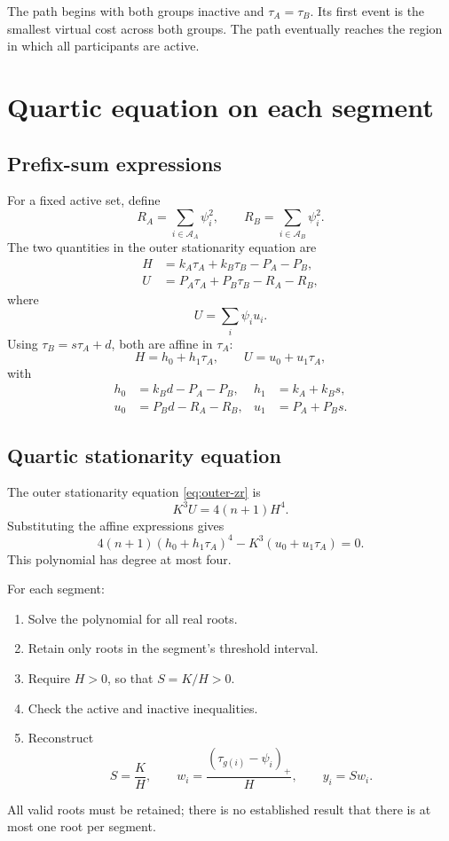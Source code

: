 \documentclass[11pt,a4paper]{article}
\newcommand{\1}{\mathbf{1}}
\begin{document}
The path begins with both groups inactive and
\(\tau_A=\tau_B\). Its first event is the smallest virtual cost across
both groups. The path eventually reaches the region in which all
participants are active.

\section{Quartic equation on each segment}

\subsection{Prefix-sum expressions}

For a fixed active set, define
\begin{equation}
  R_A=\sum_{i\in\mathcal A_A}\psi_i^2,
  \qquad
  R_B=\sum_{i\in\mathcal A_B}\psi_i^2.
\end{equation}
The two quantities in the outer stationarity equation are
\begin{align}
  H
  &=k_A\tau_A+k_B\tau_B-P_A-P_B,\\
  U
  &=P_A\tau_A+P_B\tau_B-R_A-R_B,
  \label{eq:HU}
\end{align}
where
\[
  U=\sum_i\psi_i u_i.
\]
Using \(\tau_B=s\tau_A+d\), both are affine in \(\tau_A\):
\begin{equation}
  H=h_0+h_1\tau_A,\qquad
  U=u_0+u_1\tau_A,
\end{equation}
with
\begin{align}
  h_0&=k_Bd-P_A-P_B,
  &h_1&=k_A+k_Bs,\\
  u_0&=P_Bd-R_A-R_B,
  &u_1&=P_A+P_Bs.
\end{align}

\subsection{Quartic stationarity equation}

The outer stationarity equation \eqref{eq:outer-zr} is
\[
  K^3U=4(n+1)H^4.
\]
Substituting the affine expressions gives
\begin{equation}
  \boxed{
  4(n+1)(h_0+h_1\tau_A)^4
  -K^3(u_0+u_1\tau_A)=0.
  }
  \label{eq:quartic}
\end{equation}
This polynomial has degree at most four.

For each segment:
\begin{enumerate}
  \item Solve the polynomial for all real roots.
  \item Retain only roots in the segment's threshold interval.
  \item Require \(H>0\), so that \(S=K/H>0\).
  \item Check the active and inactive inequalities.
  \item Reconstruct
  \[
    S=\frac K H,\qquad
    w_i=\frac{(\tau_{g(i)}-\psi_i)_+}{H},
    \qquad
    y_i=Sw_i.
  \]
\end{enumerate}
All valid roots must be retained; there is no established result that
there is at most one root per segment.
\end{document}
